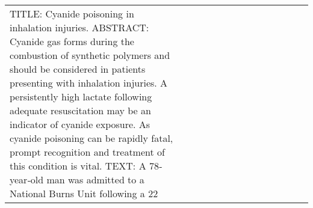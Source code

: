 \begin{longtable}{llllllllllllll}
TITLE: Cyanide poisoning in inhalation injuries. ABSTRACT: Cyanide gas forms during the combustion of synthetic polymers and should be considered in patients presenting with inhalation injuries. A persistently high lactate following adequate resuscitation may be an indicator of cyanide exposure. As cyanide poisoning can be rapidly fatal, prompt recognition and treatment of this condition is vital. TEXT: A 78‐year‐old man was admitted to a National Burns Unit following a 22%

\end{longtable}
